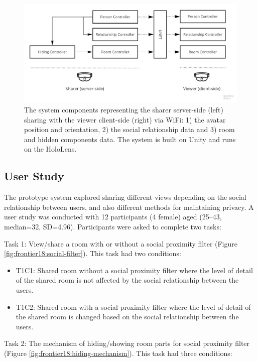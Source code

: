\begin{figure}
\begin{center}
\includegraphics[width=\linewidth]{images/frontier18/system.jpg}
\caption{The system components representing the sharer server-side (left) sharing with the viewer client-side (right) via WiFi: 1) the avatar position and orientation, 2) the social relationship data and 3) room and hidden components data. The system is built on Unity and runs on the HoloLens.}\label{fig:frontier18:system}
\end{center}
\end{figure}

\subsection{User Study}

The prototype system explored sharing different views depending on the social relationship between users, and also different methods for maintaining privacy. A user study was conducted with 12 participants (4 female) aged (25–43, median=32, SD=4.96). Participants were asked to complete two tasks: 

Task 1: View/share a room with or without a social proximity filter (Figure \ref{fig:frontier18:social-filter}). This task had two conditions: 

\begin{itemize}
\item T1C1: Shared room without a social proximity filter where the level of detail of the shared room is not affected by the social relationship between the users.
\item T1C2: Shared room with a social proximity filter where the level of detail of the shared room is changed based on the social relationship between the users. 
\end{itemize}

Task 2: The mechanism of hiding/showing room parts for social proximity filter (Figure \ref{fig:frontier18:hiding-mechanism}). This task had three conditions:

